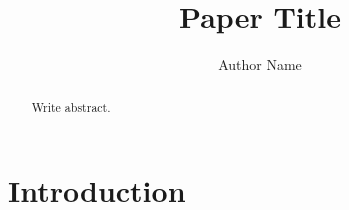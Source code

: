 \documentclass[conference]{IEEEtran}
\title{Paper Title}
\author{Author Name}
\begin{document}
\maketitle
\begin{abstract}Write abstract.\end{abstract}
\section{Introduction}
\end{document}
